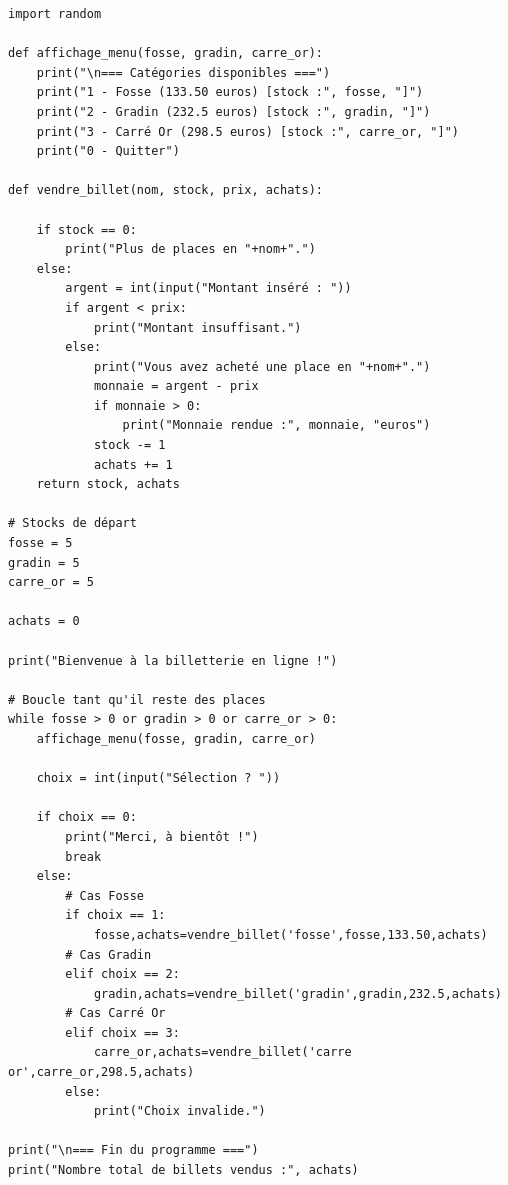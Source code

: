 \reponse{}

\begin{verbatim}
import random

def affichage_menu(fosse, gradin, carre_or):
    print("\n=== Catégories disponibles ===")
    print("1 - Fosse (133.50 euros) [stock :", fosse, "]")
    print("2 - Gradin (232.5 euros) [stock :", gradin, "]")
    print("3 - Carré Or (298.5 euros) [stock :", carre_or, "]")
    print("0 - Quitter")

def vendre_billet(nom, stock, prix, achats):

    if stock == 0:
        print("Plus de places en "+nom+".")
    else:
        argent = int(input("Montant inséré : "))
        if argent < prix:
            print("Montant insuffisant.")
        else:
            print("Vous avez acheté une place en "+nom+".")
            monnaie = argent - prix
            if monnaie > 0:
                print("Monnaie rendue :", monnaie, "euros")
            stock -= 1
            achats += 1
    return stock, achats

# Stocks de départ
fosse = 5
gradin = 5
carre_or = 5

achats = 0

print("Bienvenue à la billetterie en ligne !")

# Boucle tant qu'il reste des places
while fosse > 0 or gradin > 0 or carre_or > 0:
    affichage_menu(fosse, gradin, carre_or)

    choix = int(input("Sélection ? "))

    if choix == 0:
        print("Merci, à bientôt !")
        break
    else:
        # Cas Fosse
        if choix == 1:
            fosse,achats=vendre_billet('fosse',fosse,133.50,achats)
        # Cas Gradin
        elif choix == 2:
            gradin,achats=vendre_billet('gradin',gradin,232.5,achats)
        # Cas Carré Or
        elif choix == 3:
            carre_or,achats=vendre_billet('carre or',carre_or,298.5,achats)
        else:
            print("Choix invalide.")

print("\n=== Fin du programme ===")
print("Nombre total de billets vendus :", achats)
\end{verbatim}

\reponse{}

